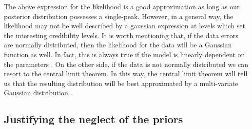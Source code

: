 \documentclass[onecolumn,           %
               showpacs,            %
               preprintnumbers,     %
               aps,                 %
               prl,          	    %
               letterpaper,             %
               superscriptaddress,      %
               nofootinbib,         %
               tightenlines,        %
               floats,floatfix      %
               ,usenatbib,
               ]{revtex4-1}
\begin{document}
The above expression for the likelihood is a good approximation as long as our posterior distribution possesses a single-peak. However, in a general way, the likelihood may not be well described by a gaussian expression at levels which set the interesting credibility levels. It is worth mentioning that, if the data errors are normally distributed, then the likelihood for the data will be a Gaussian function as well.  In fact, this is always true if the model is linearly dependent on the parameters \cite{LiV}. On the other side, if the data is not normally distributed we can resort to the central limit theorem. In this way, the central limit theorem will tell us that the resulting distribution will be best approximated by a multi-variate Gaussian distribution \cite{LiV}.
\subsection{Justifying the neglect of the priors}
\end{document}
